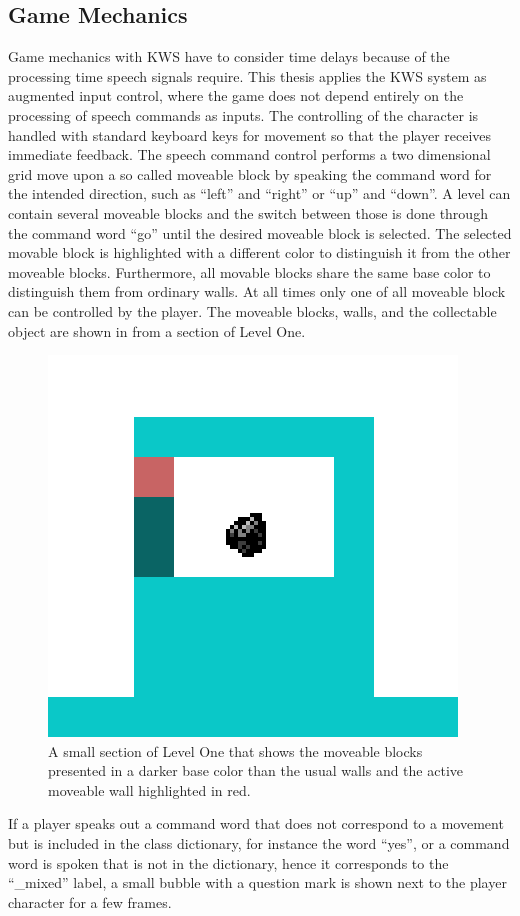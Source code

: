 \subsection{Game Mechanics}\label{sec:game_design_mechanics}
Game mechanics with KWS have to consider time delays because of the processing time speech signals require.
This thesis applies the KWS system as augmented input control, where the game does not depend entirely on the processing of speech commands as inputs.
The controlling of the character is handled with standard keyboard keys for movement so that the player receives immediate feedback. 
The speech command control performs a two dimensional grid move upon a so called moveable block by speaking the command word for the intended direction, such as \enquote{left} and \enquote{right} or \enquote{up} and \enquote{down}.
A level can contain several moveable blocks and the switch between those is done through the command word \enquote{go} until the desired moveable block is selected.
The selected movable block is highlighted with a different color to distinguish it from the other moveable blocks.
Furthermore, all movable blocks share the same base color to distinguish them from ordinary walls.
At all times only one of all moveable block can be controlled by the player.
The moveable blocks, walls, and the collectable object are shown in  from a section of Level One.
\begin{figure}[!ht]
  \centering
  \includegraphics[height=0.25\textwidth]{./6_game/figs/game_design_mechanic_thing.png}
  \caption{A small section of Level One that shows the moveable blocks presented in a darker base color than the usual walls and the active moveable wall highlighted in red.}
  \label{fig:game_design_mechanic_thing}
\end{figure}
\FloatBarrier
\noindent
If a player speaks out a command word that does not correspond to a movement but is included in the class dictionary, for instance the word \enquote{yes}, or a command word is spoken that is not in the dictionary, hence it corresponds to the \enquote{\_mixed} label, a small bubble with a question mark is shown next to the player character for a few frames.
